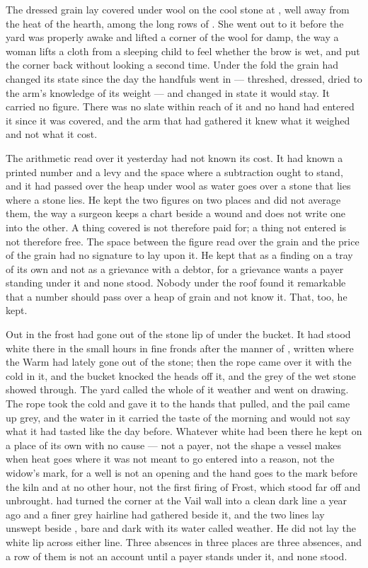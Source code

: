 \scenebreak

The dressed grain lay covered under wool on the cool stone at , well away from the heat of the hearth, among the long rows of . She went out to it before the yard was properly awake and lifted a corner of the wool for damp, the way a woman lifts a cloth from a sleeping child to feel whether the brow is wet, and put the corner back without looking a second time. Under the fold the grain had changed its state since the day the handfuls went in --- threshed, dressed, dried to the arm's knowledge of its weight --- and changed in state it would stay. It carried no figure. There was no slate within reach of it and no hand had entered it since it was covered, and the arm that had gathered it knew what it weighed and not what it cost.

The arithmetic read over it yesterday had not known its cost. It had known a printed number and a levy and the space where a subtraction ought to stand, and it had passed over the heap under wool as water goes over a stone that lies where a stone lies. He kept the two figures on two places and did not average them, the way a surgeon keeps a chart beside a wound and does not write one into the other. A thing covered is not therefore paid for; a thing not entered is not therefore free. The space between the figure read over the grain and the price of the grain had no signature to lay upon it. He kept that as a finding on a tray of its own and not as a grievance with a debtor, for a grievance wants a payer standing under it and none stood. Nobody under the roof found it remarkable that a number should pass over a heap of grain and not know it. That, too, he kept.

\scenebreak

Out in  the frost had gone out of the stone lip of  under the bucket. It had stood white there in the small hours in fine fronds after the manner of , written where the Warm had lately gone out of the stone; then the rope came over it with the cold in it, and the bucket knocked the heads off it, and the grey of the wet stone showed through. The yard called the whole of it weather and went on drawing. The rope took the cold and gave it to the hands that pulled, and the pail came up grey, and the water in it carried the taste of the morning and would not say what it had tasted like the day before. Whatever white had been there he kept on a place of its own with no cause --- not a payer, not the shape a vessel makes when heat goes where it was not meant to go entered into a reason, not the widow's mark, for a well is not an opening and the hand goes to the mark before the kiln and at no other hour, not the first firing of Frost, which stood far off and unbrought.  had turned the corner at the Vail wall into a clean dark line a year ago and a finer grey hairline had gathered beside it, and the two lines lay unswept beside , bare and dark with its water called weather. He did not lay the white lip across either line. Three absences in three places are three absences, and a row of them is not an account until a payer stands under it, and none stood.

